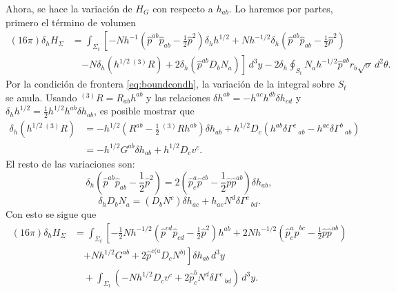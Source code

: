 Ahora, se hace la variaci\'{o}n de $H_{G}$ con respecto a $h_{ab}$. Lo haremos por partes, primero el t\'{e}rmino de volumen\footnotemark
{}
%
\begin{align}
(16 \pi) \delta_{h} H_{\Sigma} & = \int_{\Sigma_{t}} \left[ -N h^{-1} (\hat{p}^{ab} \hat{p}_{ab} - \frac{1}{2} \hat{p}^{2}) \delta_{h} h^{1/2} + N h^{-1/2} \delta_{h} (\hat{p}^{ab} \hat{p}_{ab} - \frac{1}{2} \hat{p}^{2}) \right. \nonumber \\
& \quad \left. - N \delta_{h} (h^{1/2} \, ^{(3)}R) + 2 \delta_{h} (\hat{p}^{ab} D_{b} N_{a}) \right] \, d^{3} y - 2 \delta_{h} \oint_{S_{t}} N_{a} h^{-1/2} \hat{p}^{ab} r_{b} \sqrt{\sigma} \, d^{2} \theta.
\end{align}
%
Por la condici\'{o}n de frontera \eqref{eq:boundcondh}, la variaci\'{o}n de la integral sobre $S_{t}$ se anula. Usando $^{(3)}R = R_{ab} h^{ab}$ y las relaciones $\delta h^{ab} = -h^{ac} h^{db} \delta h_{cd}$ y $\delta_{h} h^{1/2} = \frac{1}{2} h^{1/2} h^{ab} \delta h_{ab}$, es posible mostrar que
%
\begin{align*}
\delta_{h} (h^{1/2} \, ^{(3)}R) & = - h^{1/2} (R^{ab} - \frac{1}{2}\, ^{(3)}R h^{ab}) \delta h_{ab} + h^{1/2} D_{c} (h^{ab} \delta \Gamma^{c}\,_{ab} - h^{ac} \delta \Gamma^{b}\,_{ab}) \\
& = - h^{1/2} G^{ab} \delta h_{ab} + h^{1/2} D_{c} v^{c}.
\end{align*}
%
El resto de las variaciones son:
%
\begin{equation*}
\delta_{h} (\hat{p}^{ab} \hat{p}_{ab} - \frac{1}{2} \hat{p}^{2}) = 2(\hat{p}^{a}_{c} \hat{p}^{cb} - \frac{1}{2} \hat{p} \hat{p}^{ab}) \delta h_{ab},
\end{equation*}
%
\begin{equation*}
\delta_{h} D_{b} N_{a} = (D_{b} N^{c}) \delta h_{ac} + h_{ac} N^{d} \delta \Gamma^{c}\,_{bd}.
\end{equation*}
%
Con esto se sigue que
%
\begin{align}
\label{eq:vc}
(16 \pi) \delta_{h} H_{\Sigma} & = \int_{\Sigma_{t}} \left[-\frac{1}{2} N h^{-1/2} (\hat{p}^{cd} \hat{p}_{cd} - \frac{1}{2} \hat{p}^{2}) h^{ab} + 2 N h^{-1/2} (\hat{p}^{a}_{c} \hat{p}^{bc} - \frac{1}{2} \hat{p} \hat{p}^{ab}) \right. \nonumber \\
& \quad \left. + N h^{1/2} G^{ab} + 2 \hat{p}^{c (a} D_{c} N^{b)} \right] \delta h_{ab} \, d^{3} y \nonumber \\
& \quad + \int_{\Sigma_{t}} \left(-N h^{1/2} D_{c} v^{c} + 2 \hat{p}^{b}_{c} N^{d} \delta \Gamma^{c}\,_{bd} \right) \, d^{3} y.
\end{align}

